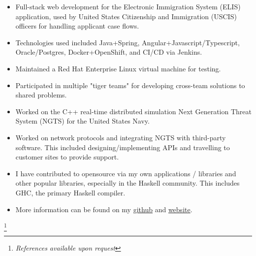 \documentclass[10pt,a4paper,ragged2e,withhyper]{altacv}
\newcommand\blfootnote[1]{%
  \begingroup
  \renewcommand\thefootnote{}\footnote{#1}%
  \addtocounter{footnote}{-1}%
  \endgroup
}
\begin{document}
\begin{itemize}
    \item Full-stack web development for the Electronic Immigration System (ELIS) application, used by United States Citizenship and Immigration (USCIS) officers for handling applicant case flows.
    \item Technologies used included Java+Spring, Angular+Javascript/Typescript, Oracle/Postgres, Docker+OpenShift, and CI/CD via Jenkins.
    \item Maintained a Red Hat Enterprise Linux virtual machine for testing.
    \item Participated in multiple "tiger teams" for developing cross-team solutions to shared problems.
\end{itemize}

\divider

\begin{itemize}
  \item Worked on the C++ real-time distributed simulation Next Generation Threat System (NGTS) for the United States Navy.
  \item Worked on network protocols and integrating NGTS with third-party software. This included designing/implementing APIs and travelling to customer sites to provide support.
\end{itemize}


\begin{itemize}
    \item I have contributed to opensource via my own applications / libraries and other popular libraries, especially in the Haskell community. This includes GHC, the primary Haskell compiler.
    \item More information can be found on my \href{https://www.github.com/tbidne}{github} and \href{https://tbidne.github.io}{website}.
\end{itemize}



\blfootnote{\textit{References available upon request}}
\end{document}

